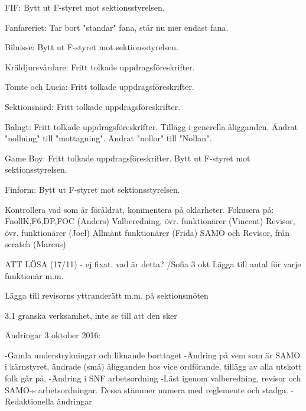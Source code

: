 FIF:
Bytt ut F-styret mot sektionsstyrelsen.

Fanfareriet:
Tar bort "standar" fana, står nu mer endast fana.

Bilnisse:
Bytt ut F-styret mot sektionsstyrelsen.

Kräldjursvårdare:
Fritt tolkade uppdragsföreskrifter.

Tomte och Lucia:
Fritt tolkade uppdragsföreskrifter.

Sektionsnörd:
Fritt tolkade uppdragsföreskrifter.

Balngt:
Fritt tolkade uppdragsföreskrifter.
Tillägg i generella åligganden.
Ändrat "nollning" till "mottagning".
Ändrat "nollor" till "Nollan".

Game Boy:
Fritt tolkade uppdragsföreskrifter.
Bytt ut F-styret mot sektionsstyrelsen.

Finform:
Bytt ut F-styret mot sektionsstyrelsen.

Kontrollera vad som är föråldrat, kommentera på oklarheter.
Fokusera på:
FnollK,F6,DP,FOC (Anders)
Valberedning, övr. funktionärer (Vincent)
Revisor, övr. funktionärer (Joel)
Allmänt funktionärer (Frida)
SAMO och Revisor, från scratch (Marcus)



ATT LÖSA (17/11)  - ej fixat. vad är detta? /Sofia 3 okt
Lägga till antal för varje funktionär m.m.

Lägga till revisorns yttranderätt m.m. på sektionsmöten

3.1 granska verksamhet, inte se till att den sker


Ändringar 3 oktober 2016: 

-Gamla understrykningar och liknande borttaget
-Ändring på vem som är SAMO i kärnstyret, ändrade (små) åligganden hos vice ordförande, tillägg av alla utskott folk går på. 
-Ändring i SNF arbetsordning
-Läst igenom valberedning, revisor och SAMO-s arbetsordningar. Dessa stämmer numera med reglemente och stadga.
-Redaktionella ändringar


